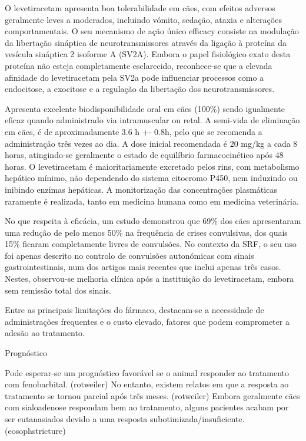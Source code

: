 O levetiracetam apresenta boa tolerabilidade em cães, com efeitos adversos geralmente leves a moderados, incluindo vómito, sedação, ataxia e alterações comportamentais. \cite{Erath2020} O seu mecanismo de ação único \cite{ajvr}\cite{contreras}\cite{Deshpande2014}\cite{Kelly2017} \cite{celdran} efficacy consiste na modulação da libertação sináptica de neurotransmissores através da ligação à proteína da vesícula sináptica 2 isoforme A (SV2A). \cite{celdran} \cite{Volk2008} \cite{contreras} \cite{Kelly2017}\cite{Packer2015}\cite{Linder2024} Embora o papel fisiológico exato desta proteína não esteja completamente esclarecido, reconhece-se que a elevada afinidade do levetiracetam  pela SV2a pode influenciar processos como a endocitose, a exocitose e a regulação da libertação dos neurotransmissores.\cite{Volk2008}


Apresenta excelente biodisponibilidade oral em cães (100\%)\cite{Volk2008} sendo igualmente eficaz quando administrado via intramuscular ou retal. \cite{Kelly2017} A semi-vida de eliminação em cães, é de aproximadamente 3.6 h +- 0.8h, pelo que se recomenda a administração três vezes ao dia.\cite{Volk2008} A dose inicial recomendada é 20 mg/kg a cada 8 horas, \cite{Linder2024} atingindo-se geralmente o estado de equilíbrio farmacocinético após 48 horas.\cite{Volk2008}
O levetiracetam é maioritariamente excretado pelos rins, com metabolismo hepático mínimo, \cite{Kelly2017} não dependendo do sistema citocromo P450, nem induzindo ou inibindo enzimas hepáticas.\cite{Volk2008} A monitorização das concentrações plasmáticas raramente é realizada, tanto em medicina humana\cite{Volk2008} como em medicina veterinária.


No que respeita à eficácia, um estudo demonstrou que 69\% dos cães apresentaram uma redução de pelo menos 50\% na frequência de crises convulsivas, dos quais 15\% ficaram completamente livres de convulsões.\cite{Packer2015} No contexto da SRF, o seu uso foi apenas descrito no controlo de convulsões autonómicas com sinais gastrointestinais, num dos artigos mais recentes que inclui apenas três casos. Nestes, observou-se melhoria clínica após a instituição do levetiracetam, embora sem remissão total dos sinais.\cite{Diop2025}


Entre as principais limitações do fármaco, destacam-se a necessidade de administrações frequentes e o custo elevado, \cite{ajvr} fatores que podem comprometer a adesão ao tratamento.

Prognóstico


Pode esperar-se um prognóstico favorável se o animal responder ao tratamento com fenobarbital. (rotweiler) No entanto, existem relatos em que a resposta ao tratamento se tornou parcial após três meses. (rotweiler) Embora geralmente cães com sialoadenose respondam bem ao tratamento, alguns pacientes acabam por ser eutanasiados devido a uma resposta subotimizada/insuficiente. (eosophstricture) 

